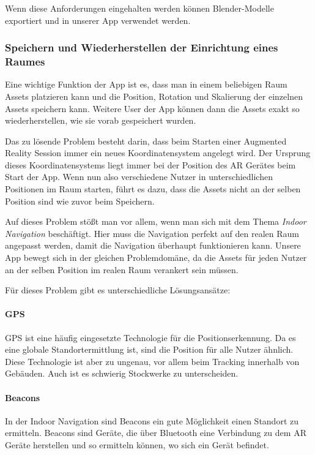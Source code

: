 \documentclass[titlepage, a4paper, 11pt]{scrartcl}
\begin{document}
    Wenn diese Anforderungen eingehalten werden können Blender-Modelle exportiert und in unserer App verwendet werden.

    \subsubsection{Speichern und Wiederherstellen der Einrichtung eines Raumes}

    Eine wichtige Funktion der App ist es, dass man in einem beliebigen Raum Assets platzieren kann und die Position, Rotation und Skalierung der einzelnen Assets speichern kann.
    Weitere User der App können dann die Assets exakt so wiederherstellen, wie sie vorab gespeichert wurden.

    Das zu lösende Problem besteht darin, dass beim Starten einer Augmented Reality Session immer ein neues Koordinatensystem angelegt wird.
    Der Ursprung dieses Koordinatensystems liegt immer bei der Position des AR Gerätes beim Start der App.
    Wenn nun also verschiedene Nutzer in unterschiedlichen Positionen im Raum starten, führt es dazu, dass die Assets nicht an der selben Position sind wie zuvor beim Speichern.
    
    Auf dieses Problem stößt man vor allem, wenn man sich mit dem Thema \textit{Indoor Navigation} beschäftigt. Hier muss die Navigation perfekt auf den realen Raum angepasst werden, damit die Navigation überhaupt funktionieren kann.
    Unsere App bewegt sich in der gleichen Problemdomäne, da die Assets für jeden Nutzer an der selben Position im realen Raum verankert sein müssen.

    Für dieses Problem gibt es unterschiedliche Lösungsansätze:

    \paragraph{GPS}
    GPS ist eine häufig eingesetzte Technologie für die Positionserkennung. Da es eine globale Standortermittlung ist, sind die Position für alle Nutzer ähnlich.
    Diese Technologie ist aber zu ungenau, vor allem beim Tracking innerhalb von Gebäuden. Auch ist es schwierig Stockwerke zu unterscheiden.

    \paragraph{Beacons}
    In der Indoor Navigation sind Beacons ein gute Möglichkeit einen Standort zu ermitteln. Beacons sind Geräte, die über Bluetooth eine Verbindung zu dem AR Geräte herstellen und so ermitteln können, wo sich ein Gerät befindet.
\end{document}
